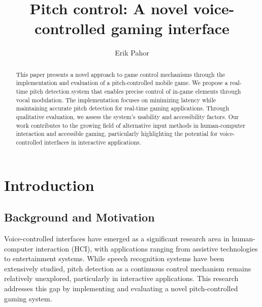 \documentclass[runningheads]{llncs}
\begin{document}
\title{Pitch control: A novel voice-controlled gaming interface}

\author{Erik Pahor}


\maketitle

\begin{abstract}
This paper presents a novel approach to game control mechanisms through the implementation and evaluation of a pitch-controlled mobile game. We propose a real-time pitch detection system that enables precise control of in-game elements through vocal modulation. The implementation focuses on minimizing latency while maintaining accurate pitch detection for real-time gaming applications. Through qualitative evaluation, we assess the system's usability and accessibility factors. Our work contributes to the growing field of alternative input methods in human-computer interaction and accessible gaming, particularly highlighting the potential for voice-controlled interfaces in interactive applications.

\end{abstract}

\section{Introduction}
\subsection{Background and Motivation}
Voice-controlled interfaces have emerged as a significant research area in human-computer interaction (HCI), with applications ranging from assistive technologies to entertainment systems. While speech recognition systems have been extensively studied, pitch detection as a continuous control mechanism remains relatively unexplored, particularly in interactive applications. This research addresses this gap by implementing and evaluating a novel pitch-controlled gaming system.
\end{document}
